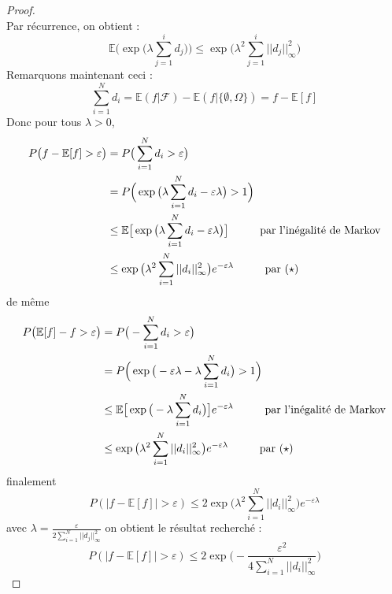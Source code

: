 \documentclass[12pt]{article}
\theoremstyle{definition}
\begin{document}
\begin{proof}
\begin{equation*}
	\end{equation*}
	Par récurrence, on obtient :
	\begin{equation*}\tag{$\star$}
	\mathbb{E}\Big(\exp\big(\lambda\sum_{j=1}^{i}d_j\big)\Big)\leq \exp\big(\lambda^2 \sum_{j=1}^{i}||d_j||_{\infty}^2\big)
	\end{equation*}
	Remarquons maintenant ceci : 
	\begin{equation*}
		\sum_{i=1}^{N}d_i = \mathbb{E}(f|\mathcal{F})-\mathbb{E}(f|\{\emptyset,\Omega\})=f-\mathbb{E}[f]
	\end{equation*}
	Donc pour tous $\lambda>0$,
	\begin{align*}
		P\big(f-\mathbb{E}[f]>\varepsilon\big)&=P\big(\sum_{i=1}^{N}d_i>\varepsilon\big)\\
		&=P\Big(\exp\big(\lambda\sum_{i=1}^{N}d_i-\varepsilon\lambda\big)>1\Big)\\
		&\leq \mathbb{E}\big[\exp\big(\lambda\sum_{i=1}^{N}d_i-\varepsilon\lambda\big)\big] \hspace{10mm} \text{par l'inégalité de Markov}\\
		&\leq \exp\big(\lambda^2 \sum_{i=1}^{N}||d_i||_{\infty}^2\big)e^{-\varepsilon\lambda}\hspace{10mm} \text{par ($\star$)}\\
	\end{align*}
	de même 
	\begin{align*}
		P\big(\mathbb{E}[f]-f>\varepsilon\big)&=P\big(-\sum_{i=1}^{N}d_i>\varepsilon\big)\\
		&=P\Big(\exp\big(-\varepsilon\lambda-\lambda\sum_{i=1}^{N}d_i\big)>1\Big)\\
		&\leq \mathbb{E}\big[\exp\big(-\lambda\sum_{i=1}^{N}d_i\big)\big]e^{-\varepsilon\lambda} \hspace{10mm} \text{par l'inégalité de Markov}\\
		&\leq \exp\big(\lambda^2 \sum_{i=1}^{N}||d_i||_{\infty}^2\big)e^{-\varepsilon\lambda}\hspace{10mm} \text{par ($\star$)} \\
	\end{align*}
	finalement 
	\begin{equation*}
		P(|f-\mathbb{E}[f]|>\varepsilon)\leq 2\exp\big(\lambda^2 \sum_{i=1}^{N}||d_i||_{\infty}^2\big)e^{-\varepsilon\lambda}
	\end{equation*}
	avec $\lambda =\frac{\varepsilon}{2\sum_{i=1}^{N}||d_j||_\infty^2}$ on obtient le résultat recherché :
	\begin{equation*}
		P(|f-\mathbb{E}[f]|>\varepsilon)\leq 2\exp\big(- \frac{\varepsilon^2}{4\sum_{i=1}^{N}||d_i||_{\infty}^2}\big)
	\end{equation*}
\end{proof}
\end{document}
